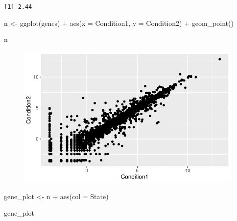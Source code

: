 \documentclass[
  letterpaper,
  DIV=11,
  numbers=noendperiod]{scrartcl}
\newenvironment{Shaded}{\begin{snugshade}}{\end{snugshade}}
\newcommand{\AttributeTok}[1]{\textcolor[rgb]{0.40,0.45,0.13}{#1}}
\newcommand{\FunctionTok}[1]{\textcolor[rgb]{0.28,0.35,0.67}{#1}}
\newcommand{\NormalTok}[1]{\textcolor[rgb]{0.00,0.23,0.31}{#1}}
\newcommand{\OtherTok}[1]{\textcolor[rgb]{0.00,0.23,0.31}{#1}}
\newcommand{\SpecialCharTok}[1]{\textcolor[rgb]{0.37,0.37,0.37}{#1}}
\begin{document}
\begin{verbatim}
[1] 2.44
\end{verbatim}

\begin{Shaded}
\begin{Highlighting}[]
\NormalTok{n }\OtherTok{\textless{}{-}} 
  \FunctionTok{ggplot}\NormalTok{(genes) }\SpecialCharTok{+}
  \FunctionTok{aes}\NormalTok{(}\AttributeTok{x =}\NormalTok{ Condition1, }\AttributeTok{y =}\NormalTok{ Condition2) }\SpecialCharTok{+}
  \FunctionTok{geom\_point}\NormalTok{()}

\NormalTok{n}
\end{Highlighting}
\end{Shaded}

\begin{figure}[H]

{\centering \includegraphics{class05_files/figure-pdf/unnamed-chunk-11-1.pdf}

}

\end{figure}

\begin{Shaded}
\begin{Highlighting}[]
\NormalTok{gene\_plot }\OtherTok{\textless{}{-}}\NormalTok{ n }\SpecialCharTok{+} \FunctionTok{aes}\NormalTok{(}\AttributeTok{col =}\NormalTok{ State)}

\NormalTok{gene\_plot}
\end{Highlighting}
\end{Shaded}
\end{document}
